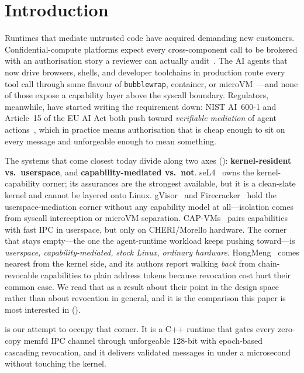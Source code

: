 \section{Introduction}
\label{sec:intro}

Runtimes that mediate untrusted code have acquired demanding new
customers. Confidential-compute platforms expect every cross-component
call to be brokered with an authorisation story a reviewer can
actually audit~\cite{tdx2024,sevsnp,arm-cca}. The AI agents that now
drive browsers, shells, and developer toolchains in production route
every tool call through some flavour of \texttt{bubblewrap},
container, or microVM~\cite{anthropic-cu,openai-agents,devin}---and
none of those expose a capability layer above the syscall boundary.
Regulators, meanwhile, have started writing the requirement down:
NIST AI~600-1 and Article~15 of the EU AI Act both push toward
\textit{verifiable mediation} of agent
actions~\cite{nist-ai-600-1,euaiact15}, which in practice means
authorisation that is cheap enough to sit on every message and
unforgeable enough to mean something.

The systems that come closest today divide along two axes
(): \textbf{kernel-resident vs.\ userspace}, and
\textbf{capability-mediated vs.\ not}. seL4~\cite{klein2009sel4} owns
the kernel-capability corner; its assurances are the strongest
available, but it is a clean-slate kernel and cannot be layered onto
Linux. gVisor~\cite{gvisor} and Firecracker~\cite{firecracker} hold
the userspace-mediation corner without any capability model at
all---isolation comes from syscall interception or microVM
separation. CAP-VMs~\cite{capvms} pairs capabilities with fast IPC in
userspace, but only on CHERI/Morello hardware. The corner that stays
empty---the one the agent-runtime workload keeps pushing toward---is
\textit{userspace, capability-mediated, stock Linux, ordinary
hardware}. HongMeng~\cite{hongmeng} comes nearest from the kernel
side, and its authors report walking \emph{back} from chain-revocable
capabilities to plain address tokens because revocation cost hurt
their common case. We read that as a result about their point in the
design space rather than about revocation in general, and it is the
comparison this paper is most interested in
().

\sysnamefull is our attempt to occupy that corner. It is a C++
runtime that gates every zero-copy memfd IPC channel through
unforgeable 128-bit \captokens with epoch-based cascading revocation,
and it delivers validated messages in under a microsecond without
touching the kernel.

